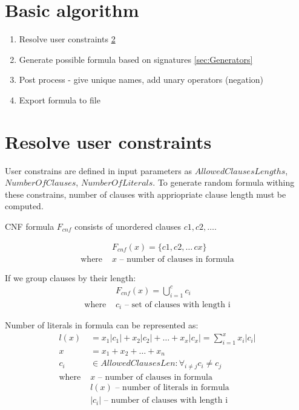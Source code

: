 \section{Basic algorithm}

\begin{enumerate}
  \item Resolve user constraints \ref{sec:ResolveUserConstrains}
  \item Generate possible formula based on signatures \ref{sec:Generators}
  \item Post process - give unique names, add unary operators (negation)
  \item Export formula to file
\end{enumerate}

\section{Resolve user constraints}
\label{sec:ResolveUserConstrains}

User constrains are defined in input parameters as $AllowedClausesLengths$, $NumberOfClauses$, $NumberOfLiterals$. To generate random formula withing these constrains, number of clauses with appriopriate clause length must be computed.

CNF formula $F_{cnf}$ consists of unordered clauses $c1, c2, \dots$. 

\begin{align*}
	&F_{cnf}(x) = \{c1, c2, \dots\, cx\} \\
	\text{where }
		&x \text{ -- number of clauses in formula}
\end{align*}

If we group clauses by their length:
\begin{align*}
	&F_{cnf}(x) = \bigcup_{i=1}^c c_i \\
	\text{where }
		&c_i \text{ -- set of clauses with length i} 
\end{align*}

Number of literals in formula can be represented as:
\begin{align*}
	l(x) &= x_1|c_1| + x_2|c_2| + \dots + x_x|c_x| = \sum_{i=1}^{x} x_i |c_i| \\
	x &= x_1 + x_2 + \dots + x_n \\
	c_i &\in AllowedClausesLen: \forall_{i \neq j} c_i \neq c_j  \\
	\text{where }
		&x \text{ -- number of clauses in formula} \\ 
		&l(x) \text{ -- number of literals in formula} \\ 
		&|c_i| \text{ -- number of clauses with length i} 
\end{align*}

